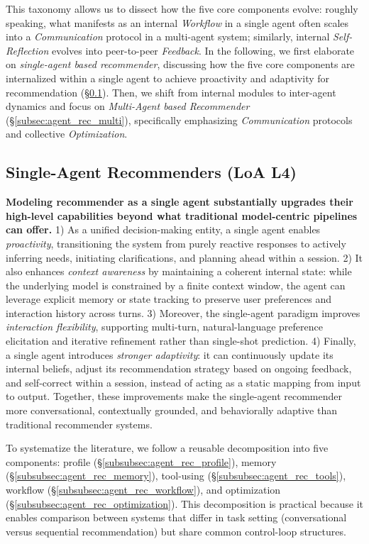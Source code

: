 This taxonomy allows us to dissect how the five core components evolve: roughly speaking, what manifests as an internal \textit{Workflow} in a single agent often scales into a \textit{Communication} protocol in a multi-agent system; similarly, internal \textit{Self-Reflection} evolves into peer-to-peer \textit{Feedback}. 
{
In the following, we first elaborate on \textit{single-agent based recommender}, discussing how the five core components are internalized within a single agent to achieve proactivity and adaptivity for recommendation (\S \ref{subsec:agent_rec_components}). 
Then, we shift from internal modules to inter-agent dynamics and focus on \textit{Multi-Agent based Recommender} (\S \ref{subsec:agent_rec_multi}), specifically emphasizing \textit{Communication} protocols and collective \textit{Optimization}. 
}



\subsection{Single-Agent Recommenders (LoA L4)}\label{subsec:agent_rec_components}

\textbf{Modeling recommender as a single agent substantially upgrades their high-level capabilities beyond what traditional model-centric pipelines can offer.} 
1) As a unified decision-making entity, a single agent enables \textit{proactivity}, transitioning the system from purely reactive responses to actively inferring needs, initiating clarifications, and planning ahead within a session. 2) It also enhances \textit{context awareness} by maintaining a coherent internal state: while the underlying model is constrained by a finite context window, the agent can leverage explicit memory or state tracking to preserve user preferences and interaction history across turns. 
3) Moreover, the single-agent paradigm improves \textit{interaction flexibility}, supporting multi-turn, natural-language preference elicitation and iterative refinement rather than single-shot prediction. 
4) Finally, a single agent introduces \textit{stronger adaptivity}: it can continuously update its internal beliefs, adjust its recommendation strategy based on ongoing feedback, and self-correct within a session, instead of acting as a static mapping from input to output. Together, these improvements make the single-agent recommender more conversational, contextually grounded, and behaviorally adaptive than traditional recommender systems.


{To systematize the literature, we follow a reusable decomposition into five components: profile (\S \ref{subsubsec:agent_rec_profile}), memory (\S \ref{subsubsec:agent_rec_memory}), tool-using (\S \ref{subsubsec:agent_rec_tools}), workflow (\S \ref{subsubsec:agent_rec_workflow}), and optimization (\S \ref{subsubsec:agent_rec_optimization}). This decomposition is practical because it enables comparison between systems that differ in task setting (\eg conversational versus sequential recommendation) but share common control-loop structures.}

